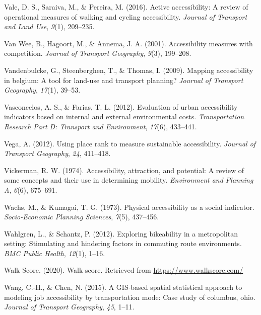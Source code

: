 \documentclass[
11pt, %
oneside, %
english, %
singlespacing, %
]{macthesis} %
\newlength{\cslhangindent}
\newenvironment{CSLReferences}[2] %
 {%
  \setlength{\parindent}{0pt}
  \ifodd #1 \everypar{\setlength{\hangindent}{\cslhangindent}}\ignorespaces\fi
  \ifnum #2 > 0
  \setlength{\parskip}{#2\baselineskip}
  \fi
 }%
 {}
\begin{document}
\begin{CSLReferences}{1}{0}
Vale, D. S., Saraiva, M., \& Pereira, M. (2016). Active accessibility: A review of operational measures of walking and cycling accessibility. \emph{Journal of Transport and Land Use}, \emph{9}(1), 209--235.

Van Wee, B., Hagoort, M., \& Annema, J. A. (2001). Accessibility measures with competition. \emph{Journal of Transport Geography}, \emph{9}(3), 199--208.

Vandenbulcke, G., Steenberghen, T., \& Thomas, I. (2009). Mapping accessibility in belgium: A tool for land-use and transport planning? \emph{Journal of Transport Geography}, \emph{17}(1), 39--53.

Vasconcelos, A. S., \& Farias, T. L. (2012). Evaluation of urban accessibility indicators based on internal and external environmental costs. \emph{Transportation Research Part D: Transport and Environment}, \emph{17}(6), 433--441.

Vega, A. (2012). Using place rank to measure sustainable accessibility. \emph{Journal of Transport Geography}, \emph{24}, 411--418.

Vickerman, R. W. (1974). Accessibility, attraction, and potential: A review of some concepts and their use in determining mobility. \emph{Environment and Planning A}, \emph{6}(6), 675--691.

Wachs, M., \& Kumagai, T. G. (1973). Physical accessibility as a social indicator. \emph{Socio-Economic Planning Sciences}, \emph{7}(5), 437--456.

Wahlgren, L., \& Schantz, P. (2012). Exploring bikeability in a metropolitan setting: Stimulating and hindering factors in commuting route environments. \emph{BMC Public Health}, \emph{12}(1), 1--16.

Walk Score. (2020). Walk score. Retrieved from \url{https://www.walkscore.com/}

Wang, C.-H., \& Chen, N. (2015). A GIS-based spatial statistical approach to modeling job accessibility by transportation mode: Case study of columbus, ohio. \emph{Journal of Transport Geography}, \emph{45}, 1--11.


\end{CSLReferences}
\end{document}
